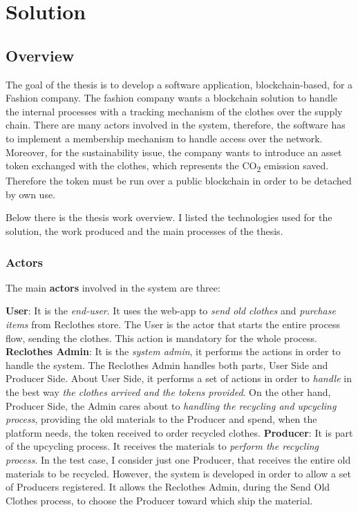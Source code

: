\chapter{Solution}


\section{Overview} 

The goal of the thesis is to develop a software application, blockchain-based, for a Fashion company. The fashion 
company wants a blockchain solution to handle the internal processes with a tracking mechanism of the clothes over 
the supply chain. There are many actors involved in the system, therefore, the software has to implement a membership 
mechanism to handle access over the network. Moreover, for the sustainability issue, the company wants to introduce an 
asset token exchanged with the clothes, which represents the CO\textsubscript{2} emission saved. Therefore the token 
must be run over a public blockchain in order to be detached by own use.   
\bigskip

Below there is the thesis work overview. I listed the technologies used for the solution, the work produced and the main
processes of the thesis. 

\subsection{Actors}

The main \textbf{actors} involved in the system are three:

\begin{outline}
    \1 \textbf{User}: It is the \textit{end-user}. It uses the web-app to \textit{send old clothes} and \textit{purchase items} from Reclothes store.
    The User is the actor that starts the entire process flow, sending the clothes. This action is mandatory for the whole process. 
    \1 \textbf{Reclothes Admin}: It is the \textit{system admin}, it performs the actions in order to handle the system.
    The Reclothes Admin handles both parts, User Side and Producer Side. About User Side, it performs a set of actions
    in order to \textit{handle} in the best way \textit{the clothes arrived and the tokens provided}. On the other hand, Producer Side, the Admin
    cares about to \textit{handling the recycling and upcycling process}, providing the old materials to the Producer
    and spend, when the platform needs, the token received to order recycled clothes.  
    \1 \textbf{Producer}: It is part of the upcycling process. It receives the materials to \textit{perform the recycling process}.
    In the test case, I consider just one Producer, that receives the entire old materials to be recycled.
    However, the system is developed in order to allow a set of Producers registered. It allows the Reclothes Admin,
    during the Send Old Clothes process, to choose the Producer toward which ship the material. 
\end{outline}

